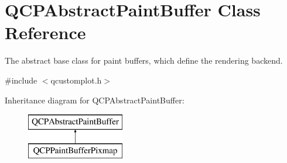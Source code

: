 \hypertarget{class_q_c_p_abstract_paint_buffer}{}\section{Q\+C\+P\+Abstract\+Paint\+Buffer Class Reference}
\label{class_q_c_p_abstract_paint_buffer}


The abstract base class for paint buffers, which define the rendering backend.  




{\ttfamily \#include $<$qcustomplot.\+h$>$}

Inheritance diagram for Q\+C\+P\+Abstract\+Paint\+Buffer\+:\begin{figure}[H]
\begin{center}
\leavevmode
\includegraphics[height=2.000000cm]{d7/de7/class_q_c_p_abstract_paint_buffer}
\end{center}
\end{figure}

